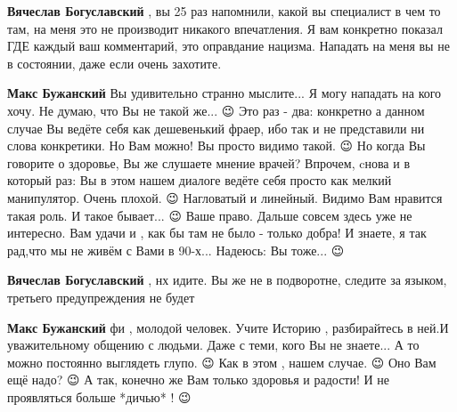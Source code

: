 \begin{itemize}
\begin{itemize}
 
\textbf{Вячеслав Богуславский} , вы 25 раз напомнили, какой вы специалист в чем
то там, на меня это не производит никакого впечатления.  Я вам конкретно
показал ГДЕ каждый ваш комментарий, это оправдание нацизма.  Нападать на меня
вы не в состоянии, даже если очень захотите.

 
\textbf{Макс Бужанский} Вы удивительно странно мыслите... Я могу нападать на
кого хочу. Не думаю, что Вы не такой же... 😉 Это раз - два: конкретно а данном
случае Вы ведёте себя как дешевенький фраер, ибо так и не представили ни слова
конкретики. Но Вам можно! Вы просто видимо такой. 😉 Но когда Вы говорите о
здоровье, Вы же слушаете мнение врачей? Впрочем, cнова и в который раз: Вы в
этом нашем диалоге ведёте себя просто как мелкий манипулятор. Очень плохой. 😉
Нагловатый и линейный. Видимо Вам нравится такая роль. И такое бывает... 😉
Ваше право. Дальше совсем здесь уже не интересно. Вам удачи и , как бы там не
было - только добра! И знаете, я так рад,что мы не живём с Вами в 90-х...
Надеюсь: Вы тоже... 😉

 
\textbf{Вячеслав Богуславский} , нх идите.
Вы же не в подворотне, следите за языком, третьего предупреждения не будет

 
\textbf{Макс Бужанский} фи , молодой человек. Учите Историю , разбирайтесь в
ней.И уважительному общению с людьми. Даже с теми, кого Вы не знаете... А то
можно постоянно выглядеть глупо. 😉 Как в этом , нашем случае. 😉 Оно Вам ещё
надо? 😉 А так, конечно же Вам только здоровья и радости! И не проявляться
больше *дичью* ! 😉


\end{itemize}
\end{itemize}
